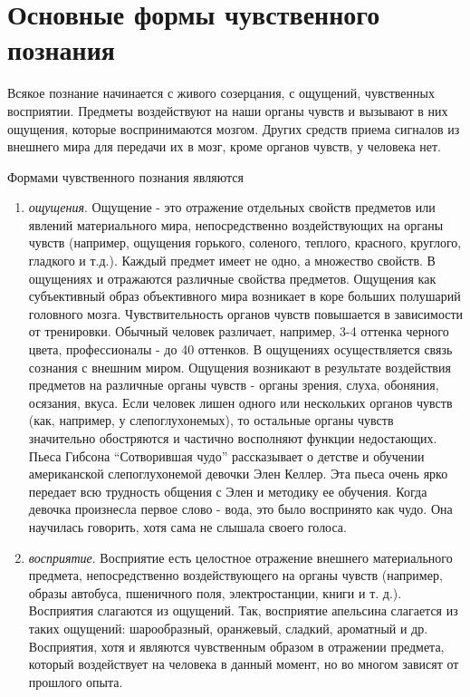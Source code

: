 \documentclass[12pt]{article}
\begin{document}
\newpage
\section{Основные формы чувственного познания}
Всякое познание начинается с живого созерцания, с ощуще­ний, чувственных восприятии.
Предметы воздействуют на наши органы чувств и вызывают в них ощущения, которые восприни­маются мозгом.
Других средств приема сигналов из внешнего мира для передачи их в мозг, кроме органов чувств, у человека нет.

Формами чувственного познания являются
\begin{enumerate}
\item \textit{ощущения}.
	Ощущение - это отражение отдель­ных свойств предметов или явлений материального мира, непосредственно воздействующих на органы чувств (например, ощущения горького, соленого, теплого, красного, круглого, гладкого и т.д.).
	Каждый предмет имеет не одно, а множество свойств.
	В ощу­щениях и отражаются различные свойства предметов.
	Ощущения как субъективный образ объективного мира возникает в коре больших полушарий головного мозга.
	Чувствительность органов чувств повышается в зависимости от тренировки.
	Обычный че­ловек различает, например, 3-4 оттенка черного цвета, профес­сионалы - до 40 оттенков.
	В ощущениях осуществляется связь сознания с внешним ми­ром.
	Ощущения возникают в результате воздействия предметов на различные органы чувств - органы зрения, слуха, обоняния, осязания, вкуса.
	Если человек лишен одного или нескольких орга­нов чувств (как, например, у слепоглухонемых), то остальные ор­ганы чувств значительно обостряются и частично восполняют функции недостающих.
	Пьеса Гибсона “Сотворившая чудо” рассказывает о детстве и обучении американской слепоглухонемой девочки Элен Келлер. 
	Эта пьеса очень ярко передает всю трудность общения с Элен и методику ее обучения.
	Когда девоч­ка произнесла первое слово - вода, это было воспринято как чудо. Она научилась говорить, хотя сама не слышала своего голоса.
\item \textit{восприятие}.
	Восприятие есть целостное отражение внешнего материаль­ного предмета, непосредственно воздействующего на органы чувств (например, образы автобуса, пшеничного поля, электро­станции, книги и т. д.).
	Восприятия слагаются из ощущений.
	Так, восприятие апельсина слагается из таких ощущений: шарообраз­ный, оранжевый, сладкий, ароматный и др.
	Восприятия, хотя и являются чувственным образом в отражении предмета, который воздействует на человека в данный момент, но во многом зави­сят от прошлого опыта.

\end{enumerate}
\end{document}
